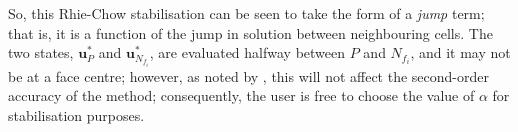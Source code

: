 \documentclass[sn-mathphys,Numbered]{sn-jnl}%
\newcommand{\bb}{\boldsymbol}
\begin{document}
So, this Rhie-Chow stabilisation can be seen to take the form of a \emph{jump} term; that is, it is a function of the jump in solution between neighbouring cells.
The two states, $\bb{u}_P^*$ and $\bb{u}_{N_{f_i}}^*$, are evaluated halfway between $P$ and $N_{f_i}$, and it may not be at a face centre; however, as noted by \citet{Nishikawa2010}, this will not affect the second-order accuracy of the method; consequently, the user is free to choose the value of $\alpha$ for stabilisation purposes.





%
%
\end{document}
